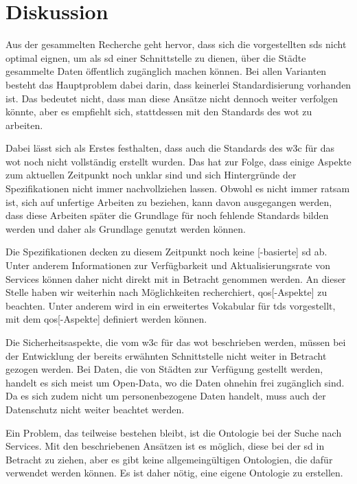 \section{Diskussion}\label{sec:discussion}

Aus der gesammelten Recherche geht hervor, dass sich die vorgestellten \glspl{sd} nicht optimal eignen, um als \gls{sd} einer Schnittstelle zu dienen, über die Städte gesammelte Daten öffentlich zugänglich machen können.
Bei allen Varianten besteht das Hauptproblem dabei darin, dass keinerlei Standardisierung vorhanden ist. Das bedeutet nicht, dass man diese Ansätze nicht dennoch weiter verfolgen könnte, aber es empfiehlt sich, stattdessen mit den Standards des \gls{wot} zu arbeiten.

Dabei lässt sich als Erstes festhalten, dass auch die Standards des \gls{w3c} \autocite{w3c.wot.architecture.20200408, w3c.wot.td.20200623, w3c.wot.bt.20200130, w3c.wot.scriptingapi.20201124, w3c.wot.discovery.20210602, w3c.wot.spg.20191106} für das \gls{wot} noch nicht vollständig erstellt wurden. Das hat zur Folge, dass einige Aspekte zum aktuellen Zeitpunkt noch unklar sind und sich Hintergründe der Spezifikationen nicht immer nachvollziehen lassen. Obwohl es nicht immer ratsam ist, sich auf unfertige Arbeiten zu beziehen, kann davon ausgegangen werden, dass diese Arbeiten später die Grundlage für noch fehlende Standards bilden werden und daher als Grundlage genutzt werden können.

Die Spezifikationen decken zu diesem Zeitpunkt noch keine [-basierte] \gls{sd} ab. Unter anderem Informationen zur Verfügbarkeit und Aktualisierungsrate von Services können daher nicht direkt mit in Betracht genommen werden. An dieser Stelle haben wir weiterhin nach Möglichkeiten recherchiert, \gls{qos}[-Aspekte] zu beachten. Unter anderem wird in  \autocite{Sciullo.DeterministicIndustrialNetworkingWebOfThings.2020} ein erweitertes Vokabular für \glspl{td} vorgestellt, mit dem \gls{qos}[-Aspekte] definiert werden können.

Die Sicherheitsaspekte, die vom \gls{w3c} für das \gls{wot} beschrieben werden, müssen bei der Entwicklung der bereits erwähnten Schnittstelle nicht weiter in Betracht gezogen werden.
Bei Daten, die von Städten zur Verfügung gestellt werden, handelt es sich meist um Open-Data, wo die Daten ohnehin frei zugänglich sind. Da es sich zudem nicht um personenbezogene Daten handelt, muss auch der Datenschutz nicht weiter beachtet werden.

Ein Problem, das teilweise bestehen bleibt, ist die Ontologie bei der Suche nach Services. Mit den beschriebenen Ansätzen ist es möglich, diese bei der \gls{sd} in Betracht zu ziehen, aber es gibt keine allgemeingültigen Ontologien, die dafür verwendet werden können. Es ist daher nötig, eine eigene Ontologie zu erstellen.

